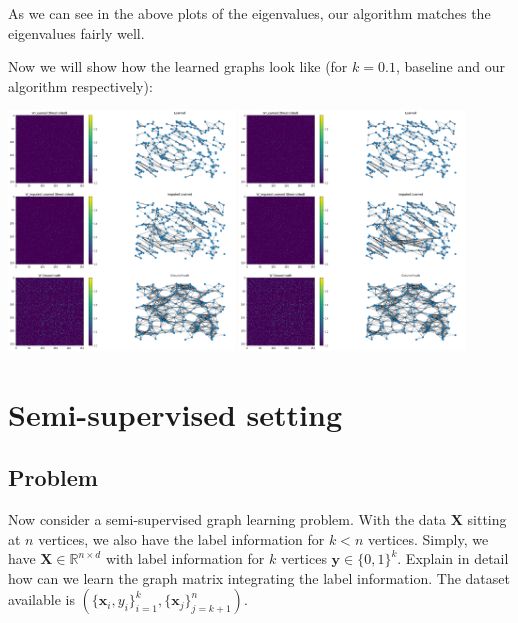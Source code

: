 \documentclass[a4paper]{article}
\newcommand{\mf}{\mathbf}
\newcommand{\R}{\mathbb{R}}
\begin{document}
As we can see in the above plots of the eigenvalues, our algorithm matches the eigenvalues fairly well.

Now we will show how the learned graphs look like (for $k = 0.1$, baseline and our algorithm respectively):

\begin{center}
    \includegraphics[width=0.45\textwidth]{images/10_percent_baseline_learned_graphs.png}
    \includegraphics[width=0.45\textwidth]{images/10_percent_own_learned_graphs.png}
\end{center}

\newpage

\section{Semi-supervised setting}

\subsection{Problem}

Now consider a semi-supervised graph learning problem. With the data $\mf{X}$ sitting at $n$ vertices, we also have the label information for $k < n$ vertices. Simply, we have $\mf{X} \in \R^{n \times
d}$ with label information for $k$ vertices $\mf{y} \in \{0, 1\}^k$. Explain in detail how can we learn the graph matrix integrating the label information. The dataset available is
$\left(\{\mf{x}_i, y_i\}_{i = 1}^k, \{\mf{x}_j\}_{j = k + 1}^n\right)$.
\end{document}
